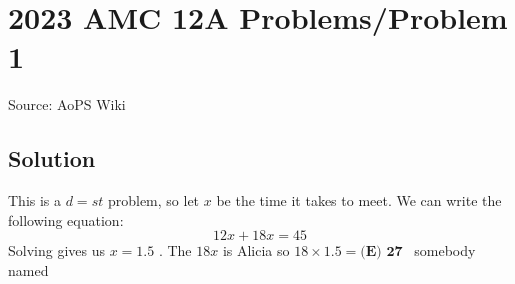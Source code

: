 \documentclass[12pt]{article}
\begin{document}
\section*{{2023 AMC 12A Problems/Problem 1}}
Source: AoPS Wiki

\subsection*{Solution}
This is a $d=st$ problem, so let $x$ be the time it takes to meet. We can write the following equation: \[12x+18x=45\] Solving gives us $x=1.5$ . The $18x$ is Alicia so $18\times1.5=\boxed{\textbf{(E) 27}}$ ~somebody named
\end{document}
